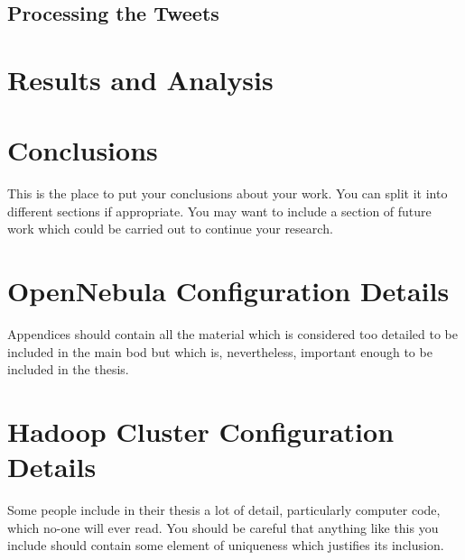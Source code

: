 \documentclass[12pt,a4paper]{report}
\begin{document}
\section{Processing the Tweets}

\chapter{Results and Analysis}


\chapter{Conclusions}

This is the place to put your conclusions about your work. You can
split it into different sections if appropriate. You may want to include
a section of future work which could be carried out to continue your
research.

\appendix

\chapter{OpenNebula Configuration Details}

Appendices should contain all the material which is considered too
detailed to be included in the main bod but which is, nevertheless,
important enough to be included in the thesis.

\chapter{Hadoop Cluster Configuration Details}

Some  people include in their \cite{fox2009above}thesis a lot of detail, particularly
computer code, which no-one will ever read. You should be careful that
anything like this you include \cite{website:aws} should contain some element
 of \cite{weinman2011future}uniqueness which justifies its inclusion.



\end{document}

